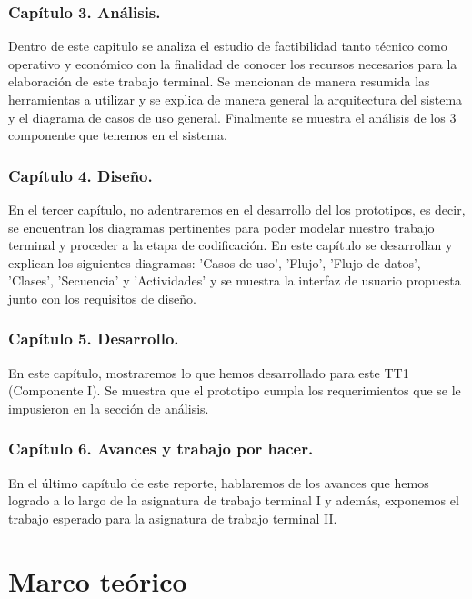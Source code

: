 \documentclass[12pt, a4paper, titlepage]{report}
\begin{document}
            \subsection{Capítulo 3. Análisis.}
                Dentro de este capitulo se analiza el estudio de factibilidad tanto t\'ecnico como operativo y económico con la finalidad de conocer los recursos necesarios para la elaboración de este trabajo terminal. Se mencionan de manera resumida las herramientas a utilizar y se explica de manera general la arquitectura del sistema  y el diagrama de casos de uso general. Finalmente se muestra el análisis de los 3 componente que tenemos en el sistema.
             
            \subsection{Capítulo 4. Diseño.}
                En el tercer capítulo, no adentraremos en el desarrollo del los prototipos, es decir, se encuentran los diagramas pertinentes para poder modelar nuestro trabajo terminal y proceder a la etapa de codificación. En este capítulo se desarrollan y explican los siguientes diagramas: 'Casos de uso', 'Flujo', 'Flujo de datos', 'Clases', 'Secuencia' y 'Actividades' y se muestra la interfaz de usuario propuesta junto con los requisitos de diseño.
                
            \subsection{Capítulo 5. Desarrollo.}
                En este capítulo, mostraremos lo que hemos desarrollado para este TT1 (Componente I). Se muestra que el prototipo cumpla los requerimientos que se le impusieron en la sección de análisis.
            
            \subsection{Capítulo 6. Avances y trabajo por hacer.}
                En el último capítulo de este reporte, hablaremos de los avances que hemos logrado a lo largo de la asignatura de trabajo terminal I y además, exponemos el trabajo esperado para la asignatura de trabajo terminal II.
            
	\chapter{\textcolor{azulescom}{Marco teórico}}
\end{document}
